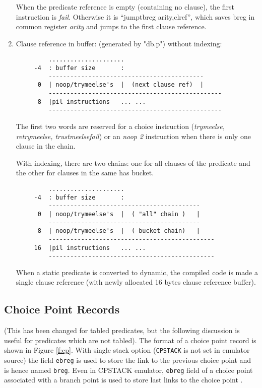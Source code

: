 \documentclass[11pt]{article}
\begin{document}
\begin{enumerate}
	When the predicate reference is empty (containing no clause),
	the first instruction is {\it fail}. Otherwise it is
	``jumptbreg arity,clref'', which saves breg in common register
	{\it arity} and jumps to the first clause reference.

    \item Clause reference in buffer: (generated by "db.p")
\label{pg:clauseref}
        without indexing:

\begin{verbatim}
         .....................
     -4  : buffer size       :
         -------------------------------------------
      0  | noop/trymeelse's  |  (next clause ref)  |
         ------------------------------------------------
      8  |pil instructions   ... ...
         ------------------------------------------------
\end{verbatim}

	The first two words are reserved for a choice instruction
	({\it trymeelse, retrymeelse, trustmeelsefail}) or an {\it noop 2}
	instruction when there is only one clause in the chain.

        With indexing, there are two chains: one for all clauses
	of the predicate and the other for clauses in the same has bucket.

\begin{verbatim}
         .....................
     -4  : buffer size       :
         ------------------------------------------
      0  | noop/trymeelse's  |  ( "all" chain )   |
         ------------------------------------------
      8  | noop/trymeelse's  |  ( bucket chain)   |
         ----------------------------------------------
     16  |pil instructions   ... ...
         ----------------------------------------------
\end{verbatim}

	When a static predicate is converted to dynamic, the compiled
	code is made a single clause reference (with newly allocated
	16 bytes clause reference buffer).
\end{enumerate}

\subsection{Choice Point Records}

(This has been changed for tabled predicates, but the following
discussion is useful for predicates which are not tabled).  The format
of a choice point record is shown in Figure \ref{f:cp}.  With single
stack option ({\tt CPSTACK} is not set in emulator source) the field
{\tt ebreg} is used to store the link to the previous choice point and
is hence named {\tt breg}. Even in CPSTACK emulator, {\tt ebreg} field
of a choice point associated with a branch point is used to store last
links to the choice point .
\end{document}
